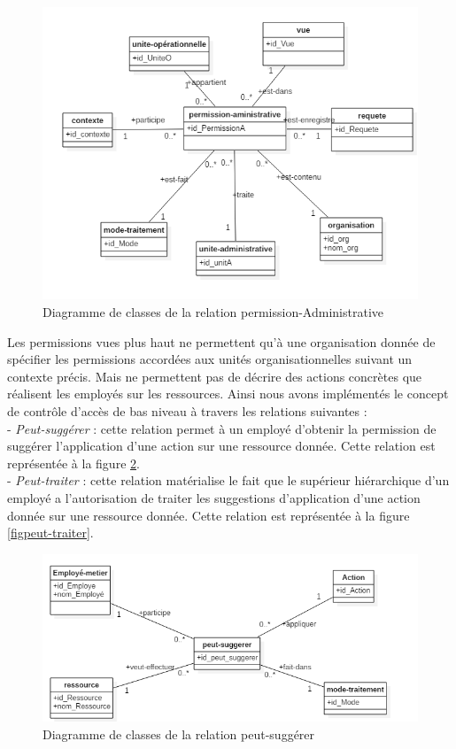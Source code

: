 \begin{figure}[h!]
    \centering
		\includegraphics[scale=0.7]{chap3/images/permissionA.png}
    \caption{Diagramme de classes de la relation permission-Administrative}
	 \label{figpermissionA}
\end{figure} 

\label{sectionSuggererTraiter}

Les permissions vues plus haut ne permettent qu'à une organisation donnée de spécifier les permissions accordées aux unités organisationnelles suivant un contexte précis. Mais ne permettent pas de décrire des actions concrètes que réalisent les employés sur les ressources. Ainsi nous avons implémentés le concept de contrôle d'accès de bas niveau à travers les relations suivantes : \\
- \textit{Peut-suggérer} : cette relation permet à un employé d'obtenir la permission de suggérer l'application d'une action sur une ressource donnée. Cette relation est représentée à la figure \ref{figpeut-suggerer}.\\
- \textit{Peut-traiter} : cette relation matérialise le fait que le supérieur hiérarchique d'un employé a l'autorisation de traiter les suggestions d'application d'une action donnée sur une ressource donnée. Cette relation est représentée à la figure \ref{figpeut-traiter}.

\begin{figure}[h!]
    \centering
		\includegraphics[scale=0.7]{chap3/images/peut-suggerer.png}
    \caption{Diagramme de classes de la relation peut-suggérer}
	 \label{figpeut-suggerer}
\end{figure} 

